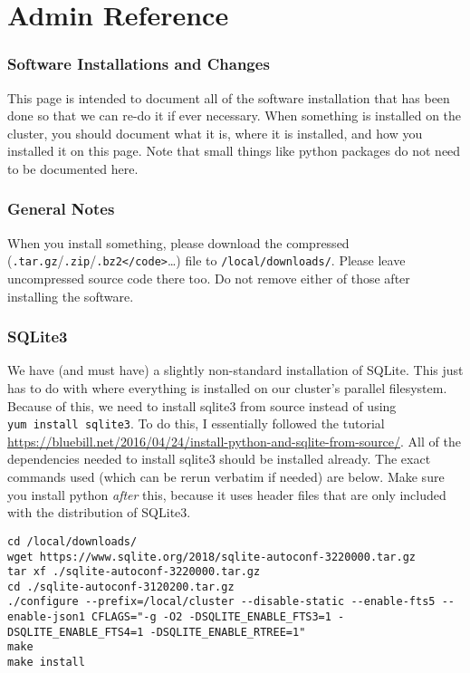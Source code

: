 \documentclass[]{book}
\theoremstyle{definition}
\theoremstyle{definition}
\theoremstyle{definition}
\theoremstyle{remark}
\begin{document}
\chapter{Admin Reference}\label{admin-reference}

\subsection{Software Installations and
Changes}\label{software-installations-and-changes}

This page is intended to document all of the software installation that
has been done so that we can re-do it if ever necessary. When something
is installed on the cluster, you should document what it is, where it is
installed, and how you installed it on this page. Note that small things
like python packages do not need to be documented here.

\subsection{General Notes}\label{general-notes}

When you install something, please download the compressed
(\texttt{.tar.gz}/\texttt{.zip}/\texttt{.bz2\textless{}/code\textgreater{}}\ldots{})
file to \texttt{/local/downloads/}. Please leave uncompressed source
code there too. Do not remove either of those after installing the
software.

\subsection{SQLite3}\label{sqlite3}

We have (and must have) a slightly non-standard installation of SQLite.
This just has to do with where everything is installed on our cluster's
parallel filesystem. Because of this, we need to install sqlite3 from
source instead of using \texttt{yum\ install\ sqlite3}. To do this, I
essentially followed the tutorial
\href{Here}{https://bluebill.net/2016/04/24/install-python-and-sqlite-from-source/}.
All of the dependencies needed to install sqlite3 should be installed
already. The exact commands used (which can be rerun verbatim if needed)
are below. Make sure you install python \emph{after} this, because it
uses header files that are only included with the distribution of
SQLite3.

\begin{verbatim}
cd /local/downloads/
wget https://www.sqlite.org/2018/sqlite-autoconf-3220000.tar.gz
tar xf ./sqlite-autoconf-3220000.tar.gz
cd ./sqlite-autoconf-3120200.tar.gz
./configure --prefix=/local/cluster --disable-static --enable-fts5 --enable-json1 CFLAGS="-g -O2 -DSQLITE_ENABLE_FTS3=1 -DSQLITE_ENABLE_FTS4=1 -DSQLITE_ENABLE_RTREE=1"
make
make install
\end{verbatim}
\end{document}
